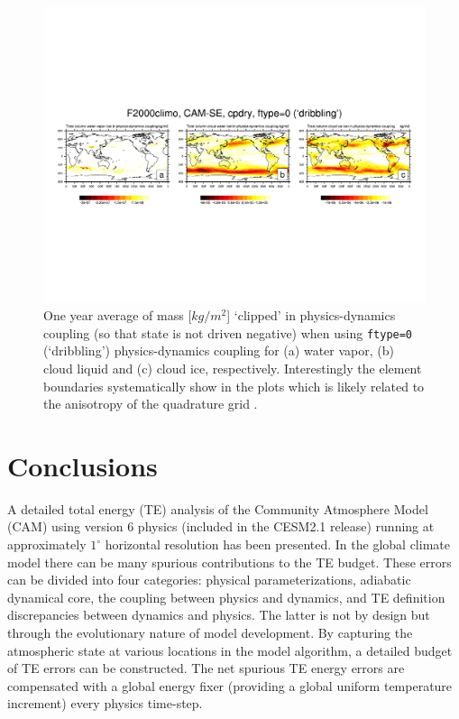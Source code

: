 \documentclass{agujournal}
\begin{document}
 \begin{figure}
 \centering
 \includegraphics[width=55pc]{figs/pdc.pdf}
 \caption{One year average of mass [$kg/m^2$] `clipped' in physics-dynamics coupling (so that state is not driven negative) when using {\tt{ftype=0}} (`dribbling') physics-dynamics coupling for (a) water vapor, (b) cloud liquid and (c) cloud ice, respectively. Interestingly the element boundaries systematically show in the plots which is likely related to the anisotropy of the quadrature grid \citep{HetAl2018MWR}.}
 \label{fig:pdc}
  \end{figure}


\section{Conclusions}\label{sec:concl}
A detailed total energy (TE) analysis of the Community Atmosphere Model (CAM) using version 6 physics (included in the CESM2.1 release) running at approximately $1^\circ$ horizontal resolution has been presented. In the global climate model there can be many spurious contributions to the TE budget. These errors can be divided into four categories: physical parameterizations, adiabatic dynamical core, the coupling between physics and dynamics, and TE definition discrepancies between dynamics and physics. The latter is not by design but through the evolutionary nature of model development. By capturing the atmospheric state at various locations in the model algorithm, a detailed budget of TE errors can be constructed. The net spurious TE energy errors are compensated with a global energy fixer (providing a global uniform temperature increment) every physics time-step.
\end{document}
